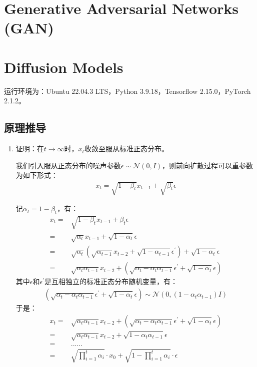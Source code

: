 \documentclass[12pt, a4paper]{article}
\newcommand{\NN}{\mathcal{N}}
\begin{document}
\section{Generative Adversarial Networks (GAN)}

\section{Diffusion Models}

    运行环境为：Ubuntu 22.04.3 LTS，Python 3.9.18，Tensorflow 2.15.0，PyTorch 2.1.2。

    \subsection{原理推导}

        \begin{enumerate}

        \item 证明：在$t \rightarrow \infty$时，$x_t$收敛至服从标准正态分布。

            我们引入服从正态分布的噪声参数$\epsilon \sim \NN(0, I)$，则前向扩散过程可以重参数为如下形式：
            \begin{align}
            x_t = \sqrt{1 - \beta_t} x_{t - 1} + \sqrt{\beta_t} \epsilon
            \end{align}

            记$\alpha_t = 1- \beta_t$，有：
            \begin{align*}
            x_t
            =& \sqrt{1 - \beta_t} x_{t - 1} + \beta_t \epsilon \\
            =& \sqrt{\alpha_t} x_{t - 1} + \sqrt{1 - \alpha_t} \epsilon \\
            =& \sqrt{\alpha_t} (\sqrt{\alpha_{t - 1}} x_{t - 2} + \sqrt{1 - \alpha_{t - 1}} \epsilon^\prime) + \sqrt{1 - \alpha_t} \epsilon \\
            =& \sqrt{\alpha_t \alpha_{t - 1}} x_{t - 2} + (\sqrt{\alpha_t - \alpha_t \alpha_{t - 1}} \epsilon^\prime + \sqrt{1 - \alpha_t} \epsilon)
            \end{align*}
            其中$\epsilon$和$\epsilon^\prime$是互相独立的标准正态分布随机变量，有：
            \begin{align*}
            (\sqrt{\alpha_t - \alpha_t \alpha_{t - 1}} \epsilon^\prime + \sqrt{1 - \alpha_t} \epsilon) \sim \NN(0, (1 - \alpha_t \alpha_{t - 1}) I)
            \end{align*}
            于是：
            \begin{align*}
            x_t
            =& \sqrt{\alpha_t \alpha_{t - 1}} x_{t - 2} + (\sqrt{\alpha_t - \alpha_t \alpha_{t - 1}} \epsilon^\prime + \sqrt{1 - \alpha_t} \epsilon) \\
            =& \sqrt{\alpha_t \alpha_{t - 1}} x_{t - 2} + \sqrt{1 - \alpha_t \alpha_{t - 1}} \epsilon \\
            =& ...... \\
            =& \sqrt{\prod \limits_{i=1}^{t} \alpha_i} \cdot x_0 + \sqrt{1 - \prod \limits_{i=1}^{t} \alpha_i} \cdot \epsilon
            \end{align*}


\end{enumerate}
\end{document}
